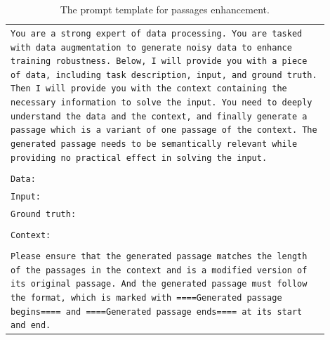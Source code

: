 \documentclass[11pt]{article}
\begin{document}
\begin{table}[ht]
\centering
\small
\begin{tabular}{>{\raggedright\arraybackslash\tt}p{0.9\linewidth}<{}}
\toprule
You are a strong expert of data processing. You are tasked with data augmentation to generate noisy data to enhance training robustness. Below, I will provide you with a piece of data, including task description, input, and ground truth. Then I will provide you with the context containing the necessary information to solve the input. You need to deeply understand the data and the context, and finally generate a passage which is a variant of one passage of the context. The generated passage needs to be semantically relevant while providing no practical effect in solving the input.\\\\
Data:\\
Input: \color{blue}{\{data\_input\}}\\
Ground truth: \color{blue}{\{data\_output\}}\\\\
Context: \color{blue}{\{context\}}\\\\
Please ensure that the generated passage matches the length of the passages in the context and is a modified version of its original passage. And the generated passage must follow the format, which is marked with ====Generated passage begins==== and ====Generated passage ends==== at its start and end.\\
\bottomrule
\end{tabular}
\caption{The prompt template for passages enhancement.}
\label{tab:tb-11}
\end{table}
\end{document}
